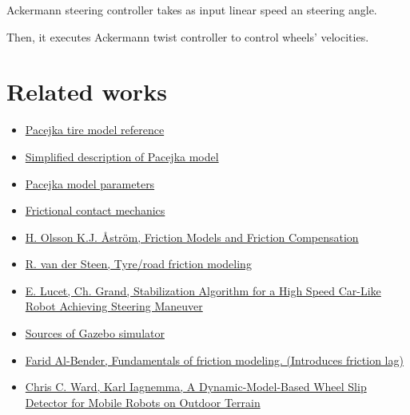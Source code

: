 \documentclass[a4paper,11pt]{article}
\begin{document}
Ackermann steering controller takes as input linear speed an steering angle. 

Then, it executes Ackermann twist controller to control wheels' velocities. 

\section{Related works}
\begin{itemize}

\item \href{http://andresmendes.github.io/Vehicle-Dynamics-Lateral/html/DocTirePacejka.html}{Pacejka tire model reference} 
\item \href{http://www-cdr.stanford.edu/dynamic/bywire/tires.pdf}{Simplified description of Pacejka model} 
\item \href{http://www.edy.es/dev/docs/pacejka-94-parameters-explained-a-comprehensive-guide/ }{Pacejka model parameters} 
\item \href{https://en.wikipedia.org/wiki/Frictional_contact_mechanics}{Frictional contact mechanics} 
\item \href{http://cats-fs.rpi.edu/~wenj/ECSE446S06/astrom_friction.pdf}{H. Olsson K.J. Åström, Friction Models and Friction Compensation} 
\item \href{http://www.mate.tue.nl/mate/pdfs/8147.pdf}{R. van der Steen, Tyre/road friction modeling} 
\item \href{http://www.isir.upmc.fr/files/icra08_lucet_et_al_optimized.pdf}{E. Lucet, Ch. Grand, Stabilization Algorithm for a High Speed Car-Like Robot Achieving Steering Maneuver} 
\item \href{https://bitbucket.org/osrf/gazebo/src}{Sources of Gazebo simulator} 
\item \href{http://aspe.net/publications/spring_2010/spr10ab/1010albender.pdf}{Farid Al-Bender, Fundamentals of friction modeling. (Introduces friction lag)} 
\item \href{http://web.mit.edu/mobility/publications/Iagnemma_TRO_07.pdf}{Chris C. Ward, Karl Iagnemma, A Dynamic-Model-Based Wheel Slip Detector
for Mobile Robots on Outdoor Terrain} 

\end{itemize}
\end{document}
